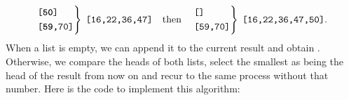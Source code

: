 \begin{equation*}
\left.
\begin{aligned}
&\texttt{[\textbf{50}]}\\
&\texttt{[\textbf{59},70]}
\end{aligned}
\right\}
\;\texttt{[16,22,36,47]}
\quad \text{then} \quad
\left.
\begin{aligned}
&\texttt{[]}\\
&\texttt{[59,70]}
\end{aligned}
\right\}
\;\texttt{[16,22,36,47,50]}.
\end{equation*}
When a list is empty, we can append it to the current result and
obtain \erlcode{[16,22,36,47,50,59,70]}. Otherwise, we compare the
heads of both lists, select the smallest as being the head of the
result from now on and recur to the same process without that
number. Here is the \Erlang code to implement this algorithm:

\label{code:merge}


